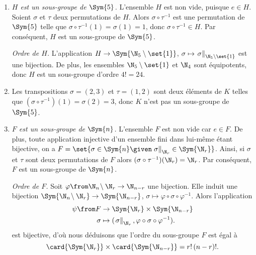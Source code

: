 \begin{enumerate}
  \item %
    \emph{$H$ est un sous-groupe de $\Sym{5}$.}
    L'ensemble $H$ est non vide, puisque $e\in H$.
    Soient $\sigma$ et $\tau$ deux permutations de $H$.
    Alors $\sigma\circ\tau^{-1}$ est une permutation de $\Sym{5}$ telle que $\sigma\circ\tau^{-1}(1) = \sigma(1) = 1$, donc $\sigma\circ\tau^{-1}\in H$.
    Par conséquent, $H$ est un sous-groupe de $\Sym{5}$.

    \emph{Ordre de $H$.}
    L'application $H\to\Sym{\N_5\setminus\set{1}}$, $\sigma\mapsto \left.\sigma\right\|_{\N_5\setminus\set{1}}$ est une bijection.
    De plus, les ensembles $\N_5\setminus\set{1}$ et $\N_4$ sont équipotents, donc $H$ est un sous-groupe d'ordre $4! = 24$.

  \item %
    Les transpositions $\sigma = (2,3)$ et $\tau = (1,2)$ sont deux éléments de $K$ telles que $(\sigma\circ\tau^{-1})(1) = \sigma(2) = 3$, donc $K$ n'est pas un sous-groupe de $\Sym{5}$.

  \item %
    \emph{$F$ est un sous-groupe de $\Sym{n}$.}
    L'ensemble $F$ est non vide car $e\in F$.
    De plus, toute application injective d'un ensemble fini dans lui-même étant bijective, on a $F = \set{\sigma\in\Sym{n} \given \left.\sigma\right\|_{\N_r}\in\Sym{\N_r}}$.
    Ainsi, si $\sigma$ et $\tau$ sont deux permutations de $F$ alors $(\sigma\circ\tau^{-1})(\N_r) = \N_r$.
    Par conséquent, $F$ est un sous-groupe de $\Sym{n}$.

    \emph{Ordre de $F$.}
    Soit $\varphi\from\N_n\!\setminus\N_r\to\N_{n-r}$ une bijection.
    Elle induit une bijection $\Sym{\N_n\!\setminus\N_r}\to\Sym{\N_{n-r}}$, $\sigma\mapsto\varphi\circ\sigma\circ\varphi^{-1}$.
    Alors l'application
    \begin{align*}
      \psi\from F &\to\Sym{\N_r}\times\Sym{\N_{n-r}} \\
      \sigma &\mapsto (\left.\sigma\right\|_{\N_r},\varphi\circ\sigma\circ\varphi^{-1}).
    \end{align*}
    est bijective, d'où nous déduisons que l'ordre du sous-groupe $F$ est égal à
    \[
      \card{\Sym{\N_r}}\times\card{\Sym{\N_{n-r}}} = r!\,(n-r)!.
    \]
\end{enumerate}
